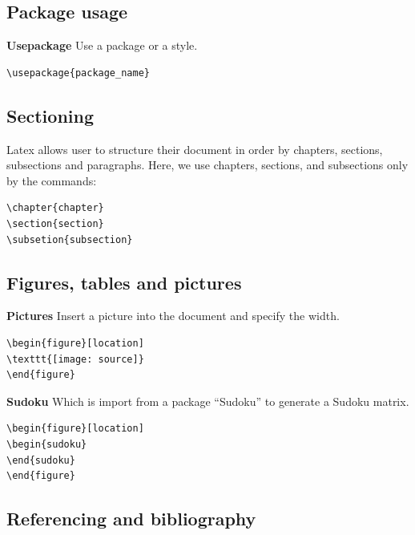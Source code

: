 \documentclass[11pt]{report}
\begin{document}
\subsection{Package usage}
\label{sec:packageusage}
\textbf{Usepackage} Use a package or a style.
\begin{verbatim}
\usepackage{package_name}
\end{verbatim}

\subsection{Sectioning}
\label{sec:sectioning}
Latex allows user to structure their document in order by chapters, sections, subsections and paragraphs. Here, we use chapters, sections, and subsections only by the commands:

\begin{verbatim}
\chapter{chapter}
\section{section}
\subsetion{subsection}
\end{verbatim}

\subsection{Figures, tables and pictures}
\label{sec:figurestablesandpictures}
\textbf{Pictures} Insert a picture into the document and specify the width.
\begin{verbatim}
\begin{figure}[location]
\texttt{[image: source]}
\end{figure}
\end{verbatim}

\textbf{Sudoku} Which is import from a package ``Sudoku'' to generate a Sudoku matrix.
\begin{verbatim}
\begin{figure}[location]
\begin{sudoku}
\end{sudoku}
\end{figure}
\end{verbatim}

\subsection{Referencing and bibliography}
\label{sec:referencingandbibliography}
\end{document}
